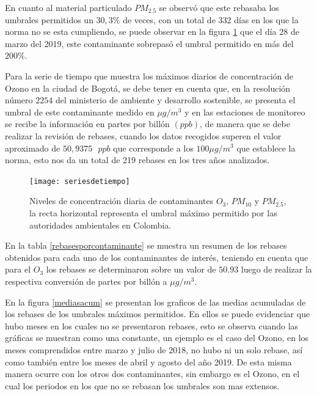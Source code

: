 En cuanto al material particulado $PM_{2.5}$ se observó que este rebasaba los umbrales permitidos un $30,3\%$ de veces, con un total de $332$ días en los que la norma no se esta cumpliendo, se puede observar en la figura \ref{seriesdet} que el día 28 de marzo del 2019, este contaminante sobrepasó el umbral permitido en más del $200\%$. 


Para la serie de tiempo que muestra los máximos diarios de concentración de Ozono en la ciudad de Bogotá, se debe tener en cuenta que, en la resolución número $2254$ del ministerio de ambiente y desarrollo sostenible, se presenta el umbral de este contaminante medido en $\mu g / m^3$ y en las estaciones de monitoreo se recibe la información en partes por billón $(ppb)$, de manera que se debe realizar la revisión de rebases, cuando los datos recogidos superen el valor aproximado de $50,9375 \text{ } ppb$ que corresponde a los $100 \mu g / m^3$ que establece la norma, esto nos da un total de 219 rebases en los tres años analizados. 



\begin{figure}[!h]
\begin{center}
\texttt{[image: seriesdetiempo]}
\end{center}
\centering
\caption{Niveles de concentración diaria de contaminantes $O_3$, $PM_{10}$ y $PM_{2.5}$, la recta horizontal representa el umbral máximo permitido por las autoridades ambientales en Colombia.}
\label{seriesdet}
\end{figure}

En la tabla \ref{rebasesporcontaminante} se muestra un resumen de los rebases obtenidos para cada uno de los contaminantes de interés, teniendo en cuenta que para el $O_3$ los rebases se determinaron sobre un valor de $50.93$ luego de realizar la respectiva conversión de partes por billón a $\mu g/m^3$. 

En la figura \ref{mediasacum} se presentan los graficos de las medias acumuladas de los rebases de los umbrales máximos permitidos. En ellos se puede evidenciar que hubo meses en los cuales no se presentaron rebases, esto se observa cuando las gráficas se muestran como una constante, un ejemplo es el caso del Ozono, en los meses comprendidos entre marzo y julio de 2018, no hubo ni un solo rebase, así como también entre los meses de abril y agosto del año 2019. De esta misma manera ocurre con los otros dos contaminantes, sin embargo es el Ozono, en el cual los periodos en los que no se rebasan los umbrales son mas extensos. 



